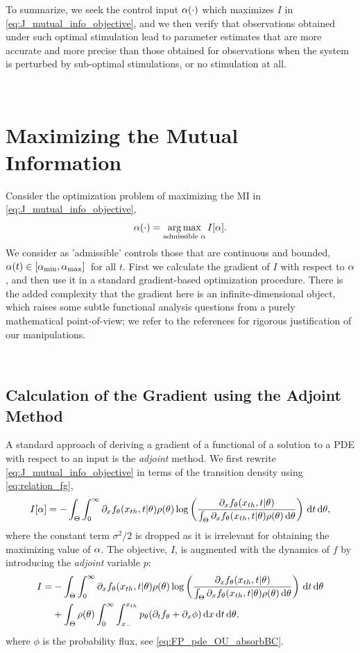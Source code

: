 To summarize, we seek the control input $\alpha(\cdot)$ which maximizes $I$ in
\cref{eq:J_mutual_info_objective}, and we then verify that observations obtained
under such optimal stimulation lead to parameter estimates that are more
accurate and more precise than those obtained for observations when the
system is perturbed by sub-optimal stimulations, or no stimulation at all.


\

\section{Maximizing the Mutual Information}
\label{sec:maximizing_MI}
Consider the optimization problem of maximizing the MI
in \cref{eq:J_mutual_info_objective}, 
$$
\a(\cdot) = \argmax_{ \textrm{admissible  } \a} I[\a].
$$ 
We consider as 'admissible' controls those that are continuous and bounded, $\alpha(t) \in [{ \alpha_{\textrm{min}} }, { \alpha_{\textrm{max}} }] \,$  for all $t$. First we calculate the gradient of $I$ with respect to $\alpha$, and then
use it in a standard gradient-based optimization procedure. There is the added
complexity that the gradient here is an infinite-dimensional object, which raises some subtle functional analysis questions from a purely mathematical
point-of-view; we refer to the references \cite{Lenhart2007,Borzi2012} for
rigorous justification of our manipulations. 

\

\subsection{Calculation of the Gradient using the Adjoint Method}

A standard approach of deriving a gradient of a
functional of a solution to a PDE with respect to an input is the {\sl
  adjoint}  method. We first rewrite
\cref{eq:J_mutual_info_objective} in terms of the transition density using
\cref{eq:relation_fg},
\begin{equation}
I[\alpha] = 
- \int_\Theta \int_0^\infty
	   {\partial}_xf_{ \theta}({ x_{th} }, t|{ \theta})  \rho({ \theta}) 
		\log \left( \frac{{\partial}_xf_{ \theta}({ x_{th} }, t|{ \theta})}
						{\int_\Theta {\partial}_xf_{ \theta}({ x_{th} }, t|{ \theta})\rho({ \theta})
\, \mathrm{d} { \theta} } \right)
\, \mathrm{d} t\, \mathrm{d} { \theta},
\label{eq:I_mutual_info_objective_in_terms_of_dixf} 
\end{equation}
where the constant term $\sigma^2/2$ is dropped as it is irrelevant for
obtaining the maximizing value of $\alpha$.
The objective, $I$, is augmented with the dynamics of $f$ by introducing the {\sl
adjoint} variable $p$: 
\begin{align}
I=&  -
\int_\Theta \int_0^\infty 
	  {\partial}_xf_{ \theta}({ x_{th} }, t|{ \theta})  \rho({ \theta}) 
		\log \left( \frac{{\partial}_xf_{ \theta}({ x_{th} }, t|{ \theta})}
						{\int_\Theta {\partial}_xf_{ \theta}({ x_{th} }, t|{ \theta})\rho({ \theta})\, \mathrm{d} { \theta} } \right)
\, \mathrm{d} t\, \mathrm{d} { \theta} 
\\
	  &+ \int_\Theta  \rho({ \theta})  \int_0^\infty \int_{x_-}^{{ x_{th} }}
	  		p_{ \theta}  ({\partial}_t f_{ \theta} + {\partial}_x \phi) 
  				\, \mathrm{d} x	  \, \mathrm{d} t \, \mathrm{d} { \theta},
	  \label{eq:adjoint_term_in_objective} 
\end{align}
where $\phi$ is the probability flux, see \cref{eq:FP_pde_OU_absorbBC}.

